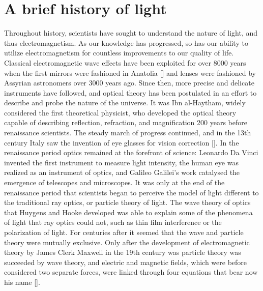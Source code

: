 
\section{A brief history of light}
Throughout history, scientists have sought to understand the nature of light, and thus electromagnetism. As our knowledge has progressed, so has our ability to utilize electromagnetism for countless improvements to our quality of life. Classical electromagnetic wave effects have been exploited for over 8000 years when the first mirrors were fashioned in Anatolia [\cite{Enoch:06}] and lenses were fashioned by Assyrian astronomers over 3000 years ago. Since then, more precise and delicate instruments have followed, and optical theory has been postulated in an effort to describe and probe the nature of the universe. It was Ibn al-Haytham, widely considered the first theoretical physicist, who developed the optical theory capable of describing reflection, refraction, and magnification 200 years before renaissance scientists. The steady march of progress continued, and in the 13th century Italy saw the invention of eye glasses for vision correction [\cite{ilardi:07}]. In the renaissance period optics remained at the forefront of science: Leonardo Da Vinci invented the first instrument to measure light intensity, the human eye was realized as an instrument of optics, and Galileo Galilei's work catalysed the emergence of telescopes and microscopes. It was only at the end of the renaissance period that scientists began to perceive the model of light different to the traditional ray optics, or particle theory of light. The wave theory of optics that Huygens and Hooke developed was able to explain some of the phenomena of light that ray optics could not, such as thin film interference or the polarization of light. For centuries after it seemed that the wave and particle theory were mutually exclusive. Only after the development of electromagnetic theory by James Clerk Maxwell in the 19th century was particle theory was succeeded by wave theory, and electric and magnetic fields, which were before considered two separate forces, were linked through four equations that bear now his name [\cite{jackson, Landau}]. 

